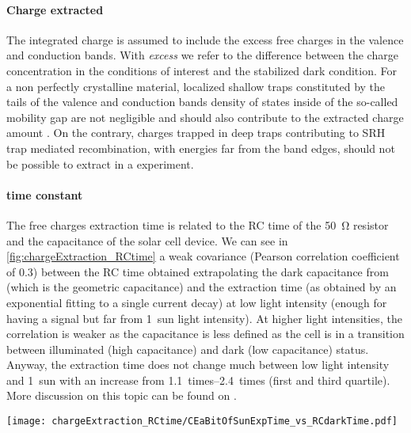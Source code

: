 
		\paragraph{Charge extracted}
		The integrated charge is assumed to include the excess free charges in the valence and conduction bands.
		With \emph{excess} we refer to the difference between the charge concentration in the conditions of interest and the stabilized dark condition.
		For a non perfectly crystalline material, localized shallow traps constituted by the tails of the valence and conduction bands density of states inside of the so-called mobility gap \cite{Pieters2009} are not negligible and should also contribute to the extracted charge amount \cite{Kirchartz2012,Du2018}.
		On the contrary, charges trapped in deep traps contributing to SRH trap mediated recombination, with energies far from the band edges, should not be possible to extract in a  experiment.

		\paragraph{ time constant}
		The free charges extraction time is related to the RC time of the \SI{50}{\ohm} resistor and the capacitance of the solar cell device.
		We can see in \cref{fig:chargeExtraction_RCtime} a weak covariance (Pearson correlation coefficient of 0.3) between the RC time obtained extrapolating the dark capacitance from  (which is the geometric capacitance) and the extraction time (as obtained by an exponential fitting to a single  current decay) at low light intensity (enough for having a signal but far from 1~sun light intensity).
		At higher light intensities, the correlation is weaker as the capacitance is less defined as the cell is in a transition between illuminated (high capacitance) and dark (low capacitance) status.
		Anyway, the extraction time does not change much between low light intensity and 1~sun with an increase from \SIrange{1.1}{2.4}{times} (first and third quartile).
		More discussion on this topic can be found on .

		\begin{SCfigure}%
			\centering
			\texttt{[image: chargeExtraction\_RCtime/CEaBitOfSunExpTime\_vs\_RCdarkTime.pdf]}
			\label{fig:chargeExtraction_RCtime}
		\end{SCfigure}

